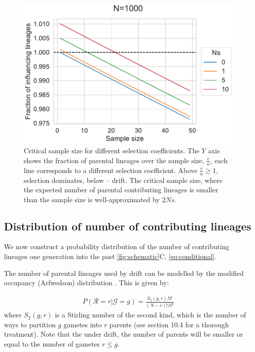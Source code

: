 \documentclass[review]{elsarticle}
\begin{document}
\begin{figure}
  \centering
  \includegraphics{fig/critical_sample_size.pdf}
  \caption{Critical sample size for different selection coefficients. The $Y$ axis shows the
    fraction of parental lineages over the sample size, $\frac{r}{n}$, each line corresponds to a
    different selection coefficient. Above $\frac{r}{n}\ge 1$, selection dominates, below -- drift.
    The critical sample size, where the expected number of parental contributing lineages is smaller
    than the sample size is well-approximated by $2Ns$.}
  \label{fig:critical-sample-size}
\end{figure}

\subsection{Distribution of number of contributing lineages}
\label{subsec:distribution}

We now construct a probability distribution of the number of contributing lineages one generation
into the past \ref{fig:schematic}C, \eqref{eq:conditional}. 

The number of parental lineages used by drift can be modelled by the modified occupancy
(Arfwedson) distribution \citep{Wakeley2009,ONeill2019,JohnsonEtAl2005}. This is given by:

\begin{align}
  \label{eq:occupancy}
  P(\mathcal{R}=r|\mathcal{G}=g) = \frac{S_2(g,r) N!}{(N-r)! N^g}
\end{align}
where $S_2(g,r)$ is a Stirling number of the second kind, which is the number of ways to partition
$g$ gametes into $r$ parents (see \cite{JohnsonEtAl2005} section 10.4 for a thorough treatment).
Note that the under drift, the number of parents will be smaller or equal to the number of gametes
$r \le g$.
\end{document}
